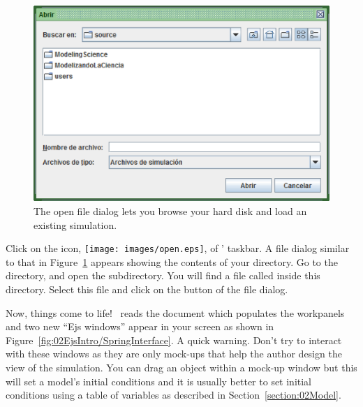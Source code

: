 \begin{figure}[htb]
  \centering
  \includegraphics[scale=\scale]{02EjsIntro/images/OpenDialog.eps}
  \caption{The open file dialog lets you browse your hard disk and load an existing simulation.}
  \label{fig:02EjsIntro/OpenDialog}
\end{figure}

Click on the  icon,  \texttt{[image: images/open.eps]}, of \ejs' taskbar. A file dialog
similar to that in Figure~\ref{fig:02EjsIntro/OpenDialog} appears showing the contents of your 
directory. Go to the  directory, and open the  subdirectory. You will find a
file called  inside this directory. Select this file and click on the  button of the
file dialog.

Now, things come to life! \ejs\ reads the  document which populates the workpanels and two new ``Ejs windows'' appear in your screen as shown in Figure~\ref{fig:02EjsIntro/SpringInterface}. A quick warning.  Don't try to interact with these windows as they are only mock-ups that help the author design the view of the
simulation. You can drag an object within a mock-up window but this will set a model's initial conditions and it is usually better to set initial conditions using a table of variables as described in Section~\ref{section:02Model}.

